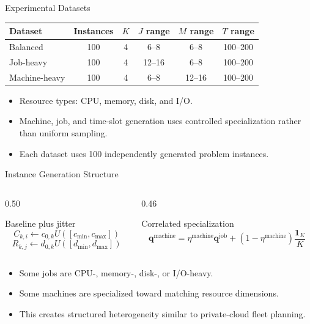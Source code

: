 \documentclass[aspectratio=169,10pt]{beamer}
\begin{document}
\begin{frame}{Experimental Datasets}
  \begin{table}
    \centering
    \small
    \begin{tabular}{@{}lccccc@{}}
      \toprule
      Dataset & Instances & $K$ & $J$ range & $M$ range & $T$ range\\
      \midrule
      Balanced & 100 & 4 & 6--8 & 6--8 & 100--200\\
      Job-heavy & 100 & 4 & 12--16 & 6--8 & 100--200\\
      Machine-heavy & 100 & 4 & 6--8 & 12--16 & 100--200\\
      \bottomrule
    \end{tabular}
  \end{table}
  \vspace{0.25cm}
  \begin{itemize}
    \item Resource types: CPU, memory, disk, and I/O.
    \item Machine, job, and time-slot generation uses controlled specialization rather than uniform sampling.
    \item Each dataset uses 100 independently generated problem instances.
  \end{itemize}
\end{frame}

\begin{frame}{Instance Generation Structure}
  \begin{columns}[T,totalwidth=\textwidth]
    \begin{column}{0.50\textwidth}
      \begin{block}{Baseline plus jitter}
        \[
          C_{k,i}\leftarrow c_{0,k}U([c_{\min},c_{\max}])
        \]
        \[
          R_{k,j}\leftarrow d_{0,k}U([d_{\min},d_{\max}])
        \]
      \end{block}
    \end{column}
    \begin{column}{0.46\textwidth}
      \begin{block}{Correlated specialization}
        \[
          \mathbf{q}^{\mathrm{machine}}
          =
          \eta^{\mathrm{machine}}\mathbf{q}^{\mathrm{job}}
          +(1-\eta^{\mathrm{machine}})\frac{\mathbf{1}_K}{K}
        \]
      \end{block}
    \end{column}
  \end{columns}
  \vspace{0.2cm}
  \begin{itemize}
    \item Some jobs are CPU-, memory-, disk-, or I/O-heavy.
    \item Some machines are specialized toward matching resource dimensions.
    \item This creates structured heterogeneity similar to private-cloud fleet planning.
  \end{itemize}
\end{frame}
\end{document}
